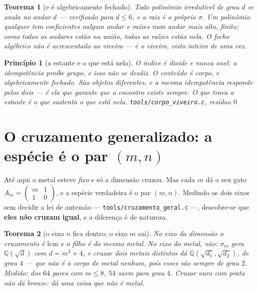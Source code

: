 \documentclass[11pt]{article}
\newcommand{\code}[1]{\texttt{\small #1}}
\newcommand{\Q}{\mathbb Q}
\theoremstyle{plain}
\newtheorem{teorema}{Teorema}
\newtheorem{principio}{Princípio}
\theoremstyle{remark}
\begin{document}
\begin{teorema}[e é algebricamente fechado]
Todo polinômio irredutível de grau $d$ se anula no andar $d$ --- verificado para $d\le6$, e a raiz
é o próprio $\sigma$. Um polinômio qualquer tem coeficientes nalgum andar e raízes num andar mais
alto, \emph{finito}; como todos os andares estão na união, todas as raízes estão nela. \emph{O fecho
algébrico não é acrescentado ao viveiro --- é o viveiro, visto inteiro de uma vez.}
\end{teorema}

\begin{principio}[a estante e o que está nela]
O índice é dioide e nunca anel: a idempotência proíbe grupo, e isso não se desdiz. O conteúdo é
corpo, e algebricamente fechado. São objetos diferentes, e a mesma idempotência responde pelos dois
--- é ela que garante que o encontro existe sempre. \emph{O que trava a estante é o que sustenta o
que está nela.} \hfill{\small\code{tools/corpo\_viveiro.c}, resíduo $0$}
\end{principio}

\section{O cruzamento generalizado: a espécie é o par $(m,n)$}

Até aqui o metal esteve \emph{fixo} e só a dimensão cruzou. Mas cada $m$ dá o seu gato
$A_m=\left(\begin{smallmatrix}m&1\\1&0\end{smallmatrix}\right)$, e a espécie verdadeira é o par
$(m,n)$. Medindo os dois eixos sem decidir a lei de antemão --- \code{tools/cruzamento\_geral.c}
---, descobre-se que \textbf{eles não cruzam igual}, e a diferença é de natureza.

\begin{teorema}[o eixo $n$ fica dentro; o eixo $m$ sai]
No eixo da dimensão o cruzamento é $\mathrm{lcm}$ e o filho é \emph{do mesmo metal}. No eixo do
metal, não: $\sigma_m$ gera $\Q(\sqrt{d})$ com $d=m^2+4$, e cruzar dois metais distintos dá
$\Q(\sqrt{d_1},\sqrt{d_2})$, de grau $4$ --- que não é o corpo de metal nenhum, pois esses são
sempre de grau $2$. Medido: dos $64$ pares com $m\le8$, $54$ saem para grau $4$.
\emph{Cruzar ouro com prata não dá bronze: dá uma coisa que não é metal.}
\end{teorema}
\end{document}
